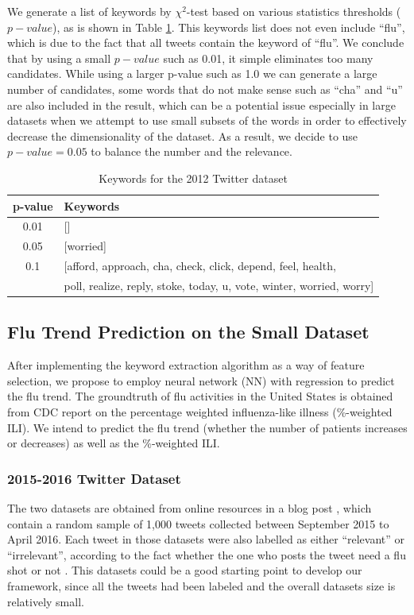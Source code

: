 \documentclass[12pt, oneside]{article}
\begin{document}
We generate a list of keywords by $\chi^2$-test based on various statistics thresholds ($p-value$), as is shown in Table \ref{table:2}.
This keywords list does not even include ``flu'', which is due to the fact that all tweets contain the keyword of ``flu''.
We conclude that by using a small $p-value$ such as 0.01, it simple eliminates too many candidates.
While using a larger p-value such as 1.0 we can generate a large number of candidates, some words that do not make sense such as ``cha'' and ``u''
are also included in the result, which can be a potential issue especially in large datasets when we attempt to use small subsets of the words
in order to effectively decrease the dimensionality of the dataset. As a result, we decide to use $p-value=0.05$ to balance the number and the relevance.


\begin{table}[h!]
  \centering
  \begin{adjustbox}{max width=\textwidth}
    \begin{tabular}{|c|l|} 
      \hline
      \textbf{p-value} & \textbf{Keywords} \\ [0.5ex] 
      \hline
      \hline
      0.01 & [] \\
      0.05 & [worried] \\
      0.1 & [afford, approach, cha, check, click, depend, feel, health,\\ 
        & poll, realize, reply, stoke, today, u, vote, winter, worried, worry]\\
      \hline
    \end{tabular}
  \end{adjustbox}
  \caption{Keywords for the 2012 Twitter dataset}
  \label{table:2}
\end{table}


\subsection{Flu Trend Prediction on the Small Dataset}
After implementing the keyword extraction algorithm as a way of feature selection, we propose to employ neural network (NN) with regression  
to predict the flu trend. The groundtruth of flu activities in the United States is obtained from CDC report on the percentage weighted influenza-like illness
(\%-weighted ILI). We intend to predict the flu trend (whether the number of patients increases or decreases) as well as the \%-weighted ILI.

\subsubsection{2015-2016 Twitter Dataset}
The two datasets are obtained from online resources in a blog post \cite{small-datasets}, which contain a random sample of 1,000 tweets
collected between September 2015 to April 2016. Each tweet in those datasets were also labelled as either ``relevant'' or ``irrelevant'',
according to the fact whether the one who posts the tweet need a flu shot or not \cite{small-datasets}.
This datasets could be a good starting point to develop our framework, since all the tweets had been labeled and the overall datasets size is relatively small. 
\end{document}
